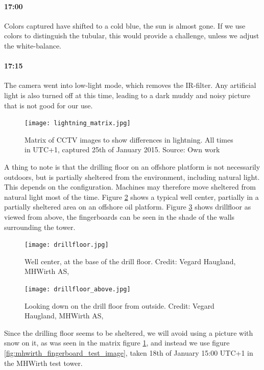 \paragraph{17:00} Colors captured have shifted to a cold blue, the sun is almost gone. If we use colors to distinguish the tubular, this would provide a challenge, unless we adjust the white-balance.

\paragraph{17:15} The camera went into low-light mode, which removes the IR-filter. Any artificial light is also turned off at this time, leading to a dark muddy and noisy picture that is not good for our use.

\begin{figure}[ht]
    \centering
    \texttt{[image: lightning\_matrix.jpg]}
    \caption{Matrix of CCTV images to show differences in lightning. All times in UTC+1, captured 25th of January 2015. Source: Own work}
    \label{fig:lightning_matrix}
\end{figure}
\FloatBarrier

A thing to note is that the drilling floor on an offshore platform is not necessarily outdoors, but is partially sheltered from the environment, including natural light. This depends on the configuration. Machines may therefore move sheltered from natural light most of the time. Figure \ref{fig:wellcenter} shows a typical well center, partially in a partially sheltered area on an offshore oil platform. Figure \ref{fig:drillfloor_above} shows drillfloor as viewed from above, the fingerboards can be seen in the shade of the walls surrounding the tower.

\begin{figure}[ht]
    \centering
    \texttt{[image: drillfloor.jpg]}
    \caption{Well center, at the base of the drill floor. Credit: Vegard Haugland, MHWirth AS, \citet{hauglandfoto15}}
    \label{fig:wellcenter}
\end{figure}
\FloatBarrier

\begin{figure}[ht]
    \centering
    \texttt{[image: drillfloor\_above.jpg]}
    \caption{Looking down on the drill floor from outside. Credit: Vegard Haugland, MHWirth AS, \citet{hauglandfoto15}}
    \label{fig:drillfloor_above}
\end{figure}
\FloatBarrier

Since the drilling floor seems to be sheltered, we will avoid using a picture with snow on it, as was seen in the matrix figure \ref{fig:lightning_matrix}, and instead we use figure \ref{fig:mhwirth_fingerboard_test_image}, taken 18th of January 15:00 UTC+1 in the MHWirth test tower.

